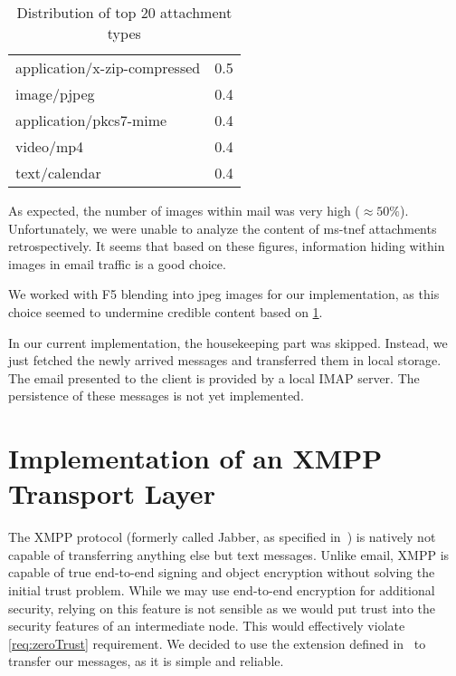 \begin{table}[ht]
\begin{tabular}{l|r}
		application/x-zip-compressed                                                &    0.5\\
		image/pjpeg                                                                 &    0.4\\
		application/pkcs7-mime                                                      &    0.4\\
		video/mp4                                                                   &    0.4\\
		text/calendar                                                               &    0.4\\\hline
	\end{tabular}
	\caption{Distribution of top 20 attachment types}
	\label{tab:emailAttachments}
\end{table}

As expected, the number of images within mail was very high ($\approx 50\%$). Unfortunately, we were unable to analyze the content of ms-tnef attachments retrospectively. It seems that based on these figures, information hiding within images in email traffic is a good choice.

We worked with F5 blending into jpeg images for our implementation, as this choice seemed to undermine credible content based on \cref{tab:emailAttachments}.

In our current implementation, the housekeeping part was skipped. Instead, we just fetched the newly arrived messages and transferred them in local storage. The email presented to the client is provided by a local IMAP server. The persistence of these messages is not yet implemented. 

\section{Implementation of an XMPP Transport Layer}
The XMPP protocol (formerly called  Jabber, as specified in~\cite{rfc6120}) is natively not capable of transferring anything else but text messages. Unlike email, XMPP is capable of true end-to-end signing and object encryption without solving the initial trust problem. While we may use end-to-end encryption for additional security, relying on this feature is not sensible as we would put trust into the security features of an intermediate node. This would effectively violate \ref{req:zeroTrust} requirement. We decided to use the extension defined in~\cite{xep0231} to transfer our messages, as it is simple and reliable.


